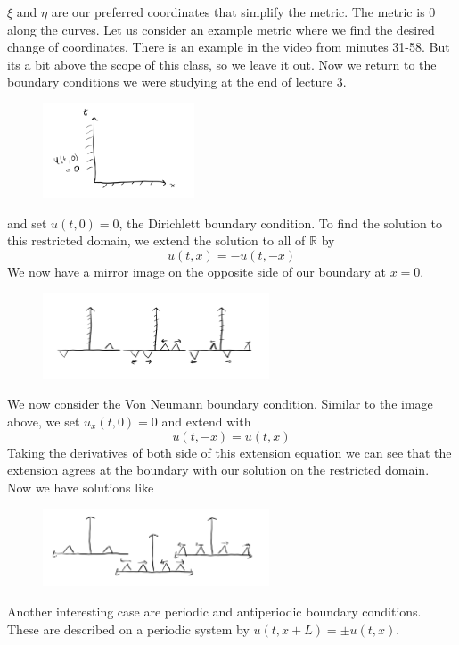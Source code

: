 \documentclass[11pt,a4paper]{article}
\begin{document}
$\xi$ and $\eta$ are our preferred coordinates that simplify the metric. The metric is 0 along the curves. Let us consider an example metric where we find the desired change of coordinates. There is an example in the video from minutes 31-58. But its a bit above the scope of this class, so we leave it out.
Now we return to the boundary conditions we were studying at the end of lecture 3. 
\begin{figure}[H]
	\centering
	\includegraphics[width=0.4\textwidth]{dirichlett.png} %
\end{figure}
and set $u(t,0)=0$, the Dirichlett boundary condition. To find the solution to this restricted domain, we extend the solution to all of $\mathbb{R}$ by
$$
u(t,x) = -u(t,-x)
$$
We now have a mirror image on the opposite side of our boundary at $x=0$.
\begin{figure}[H]
	\centering
	\includegraphics[width=0.6\textwidth]{reflection.png} %
\end{figure}
We now consider the Von Neumann boundary condition. Similar to the image above, we set $u_{x}(t,0) = 0$ and extend with 
$$
u(t,-x) = u(t,x)
$$
Taking the derivatives of both side of this extension equation we can see that the extension agrees at the boundary with our solution on the restricted domain. Now we have solutions like
\begin{figure}[H]
	\centering
	\includegraphics[width=0.6\textwidth]{vn.png} %
\end{figure}
Another interesting case are periodic and antiperiodic boundary conditions. These are described on a periodic system by $u(t,x+L)= \pm u(t,x)$. 
\end{document}
